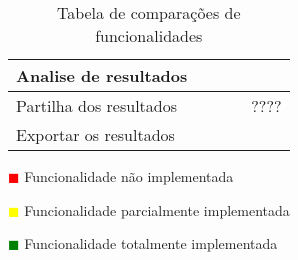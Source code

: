 \begin{table}[!ht]
\begin{center}
\begin{tabular}{|p{4cm}|p{1.5cm}|p{1.5cm}|p{1.5cm}|p{1.5cm}|}
			 Analise de resultados & \cellcolor{green!80}   & \cellcolor{yellow!80} & \cellcolor{yellow!80} & \cellcolor{green!80}  \\ \hline
			
			Partilha dos resultados & \cellcolor{green!80}   & \cellcolor{green!80}   & \cellcolor{green!80}  & ???? \\ \hline
			
			Exportar os resultados & \cellcolor{green!80}   & \cellcolor{green!80}   & \cellcolor{green!80}  & \cellcolor{green!80}  \\ \hline
			
			
		\end{tabular}
	\end{center}
\hspace{1.2cm}	\textcolor{red}{$\blacksquare$} Funcionalidade não implementada

\hspace{1.2cm}     \textcolor{yellow}{$\blacksquare$} Funcionalidade parcialmente implementada

\hspace{1.2cm}     \textcolor{green}{$\blacksquare$} Funcionalidade totalmente implementada 
\begin{center}
	\caption{Tabela de comparações de funcionalidades}
	\label{tab:comparacao}
\end{center}
	\end{table}


\blankpage

\glsresetall



